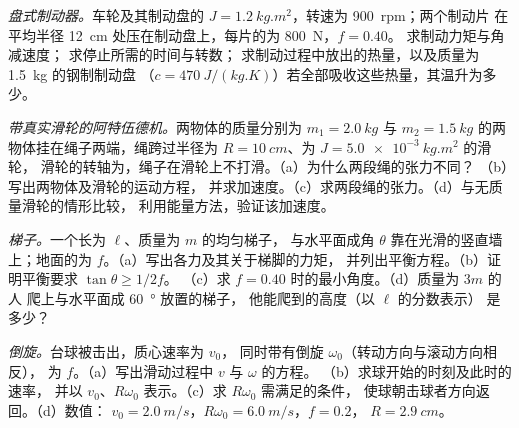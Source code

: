 \begin{exercise}[$\star\star$]\label{exo:b2:rigid-body-mechanics:6}
\emph{盘式制动器。}车轮及其制动盘的 $J = \qty{1.2}{kg.m^2}$，转速为 \qty{900}{rpm}；两个制动片
在平均半径 \qty{12}{cm} 处压在制动盘上，每片的为 \qty{800}{N}，$f = 0.40$。
求制动力矩与角减速度；
求停止所需的时间与转数；
求制动过程中放出的热量，以及质量为 \qty{1.5}{kg} 的钢制制动盘
（$c = \qty{470}{J/(kg.K)}$）若全部吸收这些热量，其温升为多少。
\end{exercise}

\begin{exercise}[$\star\star$]\label{exo:b2:rigid-body-mechanics:7}
\emph{带真实滑轮的阿特伍德机。}两物体的质量分别为 $m_1 = \qty{2.0}{kg}$
与 $m_2 = \qty{1.5}{kg}$ 的两物体挂在绳子两端，绳跨过半径为 $R =
\qty{10}{cm}$、为 $J = \qty{5.0e-3}{kg.m^2}$ 的滑轮，
滑轮的转轴为，绳子在滑轮上不打滑。（a）为什么两段绳的张力不同？
（b）写出两物体及滑轮的运动方程，
并求加速度。（c）求两段绳的张力。（d）与无质量滑轮的情形比较，
利用能量方法，验证该加速度。
\end{exercise}

\begin{exercise}[$\star\star$]\label{exo:b2:rigid-body-mechanics:8}
\emph{梯子。}一个长为 $\ell$、质量为 $m$ 的均匀梯子，
与水平面成角 $\theta$ 靠在光滑的竖直墙上；地面的为 $f$。（a）写出各力及其关于梯脚的力矩，
并列出平衡方程。（b）证明平衡要求 $\tan\theta \ge 1/2f$。
（c）求 $f = 0.40$ 时的最小角度。（d）质量为 $3m$ 的人
爬上与水平面成 \qty{60}{\degree} 放置的梯子，
他能爬到的高度（以 $\ell$ 的分数表示）
是多少？
\end{exercise}

\begin{exercise}[$\star\star$]\label{exo:b2:rigid-body-mechanics:9}
\emph{倒旋。}台球被击出，质心速率为 $v_0$，
同时带有倒旋 $\omega_0$（转动方向与滚动方向相反），
为 $f$。（a）写出滑动过程中 $v$ 与 $\omega$ 的方程。
（b）求球开始的时刻及此时的速率，
并以 $v_0$、$R\omega_0$ 表示。（c）求 $R\omega_0$ 需满足的条件，
使球朝击球者方向返回。（d）数值：
$v_0 = \qty{2.0}{m/s}$，$R\omega_0 = \qty{6.0}{m/s}$，$f = 0.2$，
$R = \qty{2.9}{cm}$。
\end{exercise}

